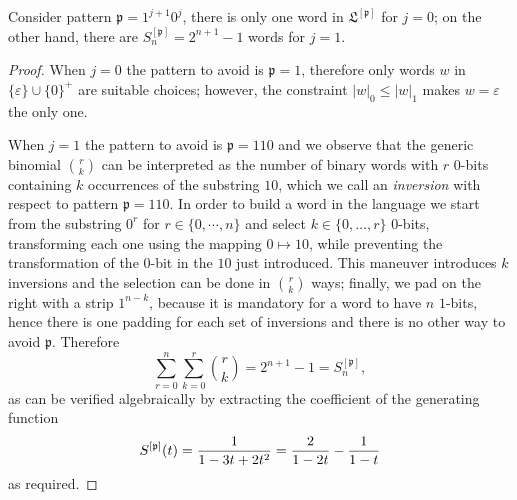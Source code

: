 \begin{coro}
\label{coro:1_j1_0_j}
Consider pattern $\mathfrak{p}=1^{j+1}0^{j}$, there is only one word in
$\mathfrak{L}^{[\mathfrak{p}]}$ for $j=0$; on the other hand, there are
$S_{n}^{[\mathfrak{p}]} = 2^{n+1}-1$ words for $j=1$.
\end{coro}

\begin{proof}
When $j=0$ the pattern to avoid is $\mathfrak{p}=1$, therefore only words
$w$ in $ \lbrace \varepsilon \rbrace\cup\lbrace 0 \rbrace^{+}$ are suitable choices;
however, the constraint $|w|_{0} \leq |w|_{1}$ makes $w = \varepsilon$ the only one.

When $j=1$ the pattern to avoid is $\mathfrak{p}=110$ and we observe that the
generic binomial ${{ {r}\choose{k}}}$ can be interpreted as the number of
binary words with $r$ $0$-bits  containing $k$ occurrences of the substring
$10$, which we call an \emph{inversion} with respect to pattern $\mathfrak{p}=110$.
In order to build a word in the language we start from the substring $0^{r}$ for
$r\in\lbrace 0,\cdots,n\rbrace$ and select $k\in \lbrace 0, \ldots,r
\rbrace$ $0$-bits, transforming each one using the mapping $0 \mapsto 10$,
while preventing the transformation of the $0$-bit in the $10$ just introduced. This
maneuver introduces $k$ inversions and the selection can be done in ${{
{r}\choose{k}}}$ ways; finally, we pad on the right with a strip $1^{n-k}$,  because it is mandatory for a word to have $n$
$1$-bits, hence there is one padding for each set of inversions and there is no other way to avoid $\mathfrak{p}$. Therefore
\begin{displaymath}
     \sum_{r=0}^{n}{\sum_{k=0}^{r}{{ {r}\choose{k}}}} = 2^{n+1}-1 = S_{n}^{[\mathfrak{p}]},
\end{displaymath}
as can be verified algebraically by extracting the coefficient of the generating function
$$S^{[\mathfrak{p}]}(t)={1 \over 1-3t+2t^2}={2 \over 1-2t}-{1 \over 1-t}$$
as required.
\end{proof}


